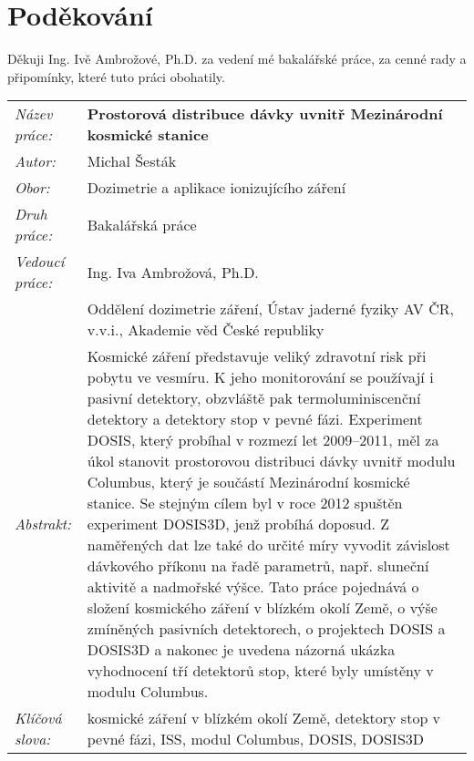 \section*{Poděkování}
Děkuji Ing. Ivě Ambrožové, Ph.D. za vedení mé bakalářské práce, za cenné rady a připomínky, které tuto práci obohatily.
\newpage
\begin{tabularx}{\textwidth}{>{\itshape}l X}
  Název práce: & \textbf{Prostorová distribuce dávky uvnitř Mezinárodní kosmické stanice}\\
  Autor: & Michal Šesták\\
  Obor: & Dozimetrie a aplikace ionizujícího záření\\
  Druh práce: & Bakalářská práce\\
  Vedoucí práce: & Ing. Iva Ambrožová, Ph.D.\\ 
               & Oddělení dozimetrie záření, Ústav jaderné fyziky AV ČR, v.v.i., Akademie věd České republiky\\
  Abstrakt: & Kosmické záření představuje veliký zdravotní risk při pobytu ve vesmíru. K jeho monitorování se používají i pasivní detektory, obzvláště pak termoluminiscenční detektory a detektory stop v pevné fázi. Experiment DOSIS, který probíhal v rozmezí let 2009--2011, měl za úkol stanovit prostorovou distribuci dávky uvnitř modulu Columbus, který je součástí Mezinárodní kosmické stanice. Se stejným cílem byl v roce 2012 spuštěn experiment DOSIS3D, jenž probíhá doposud. Z naměřených dat lze také do určité míry vyvodit závislost dávkového příkonu na řadě parametrů, např. sluneční aktivitě a nadmořské výšce. 
  Tato práce pojednává o složení kosmického záření v blízkém okolí Země, o výše zmíněných pasivních detektorech, o projektech DOSIS a DOSIS3D a nakonec je uvedena názorná ukázka vyhodnocení tří detektorů stop, které byly umístěny v modulu Columbus. \\
  Klíčová slova: & kosmické záření v blízkém okolí Země, detektory stop v pevné fázi, ISS, modul Columbus, DOSIS, DOSIS3D
\end{tabularx}
\newpage
